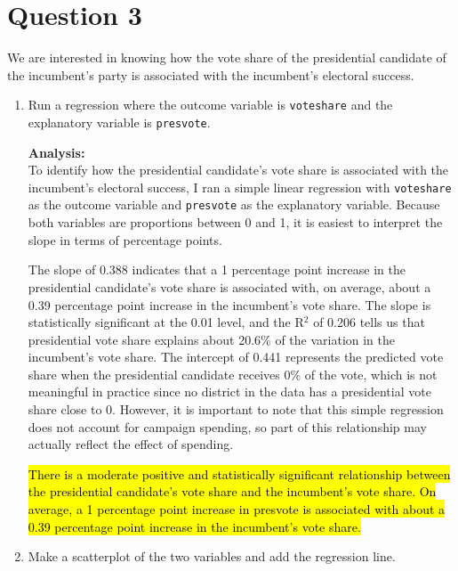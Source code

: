 \documentclass[12pt,letterpaper]{article}
\begin{document}
	\newpage	
\section*{Question 3}

\noindent We are interested in knowing how the vote share of the presidential candidate of the incumbent's party is associated with the incumbent's electoral success.
	\begin{enumerate}
		\item Run a regression where the outcome variable is \texttt{voteshare} and the explanatory variable is \texttt{presvote}.
		
		
		
		
		\textbf{Analysis:}\\
		To identify how the presidential candidate's vote share is associated with the incumbent's electoral success, I ran a simple linear regression with \texttt{voteshare} as the outcome variable and \texttt{presvote} as the explanatory variable. Because both variables are proportions between 0 and 1, it is easiest to interpret the slope in terms of percentage points.
		
		The slope of 0.388 indicates that a 1 percentage point increase in the presidential candidate's vote share is associated with, on average, about a 0.39 percentage point increase in the incumbent's vote share. The slope is statistically significant at the 0.01 level, and the R$^2$ of 0.206 tells us that presidential vote share explains about 20.6\% of the variation in the incumbent's vote share. The intercept of 0.441 represents the predicted vote share when the presidential candidate receives 0\% of the vote, which is not meaningful in practice since no district in the data has a presidential vote share close to 0. However, it is important to note that this simple regression does not account for campaign spending, so part of this relationship may actually reflect the effect of spending.
		
		\hl{There is a moderate positive and statistically significant relationship between the presidential candidate's vote share and the incumbent's vote share. On average, a 1 percentage point increase in presvote is associated with about a 0.39 percentage point increase in the incumbent's vote share.}
		
		\item Make a scatterplot of the two variables and add the regression line. 
		

\end{enumerate}
\end{document}
